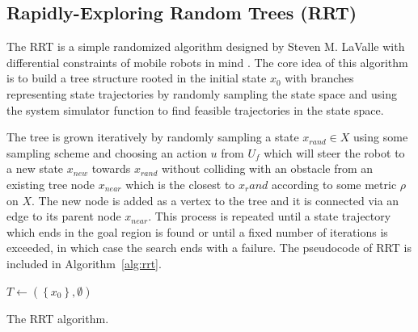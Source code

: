 \subsection{Rapidly-Exploring Random Trees (RRT)}

The \gls{RRT} is a simple randomized algorithm designed by Steven M. LaValle with differential constraints of mobile robots in mind \cite{RRT}. The core idea of this algorithm is to build a tree structure rooted in the initial state $x_0$ with branches representing state trajectories by randomly sampling the state space and using the system simulator function to find feasible trajectories in the state space.

The tree is grown iteratively by randomly sampling a state $x_{rand}\in X$ using some sampling scheme and choosing an action $u$ from $U_f$ which will steer the robot to a new state $x_{new}$ towards $x_{rand}$ without colliding with an obstacle from an existing tree node $x_{near}$ which is the closest to $x_rand$ according to some metric $\rho$ on $X$. The new node is added as a vertex to the tree and it is connected via an edge to its parent node $x_{near}$. This process is repeated until a state trajectory which ends in the goal region is found or until a fixed number of iterations is exceeded, in which case the search ends with a failure. The pseudocode of RRT is included in Algorithm~\ref{alg:rrt}.

\begin{algorithm}
	\SetAlgoLined
	\DontPrintSemicolon
	
	
	
	$T\gets \left(\left\{x_0\right\}, \emptyset\right)$\;
	
	
	\;
	
	\caption{The RRT algorithm.}
	\label{alg:rrt}
\end{algorithm}

